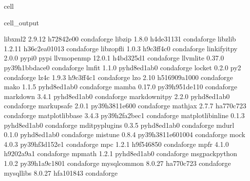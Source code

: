 \documentclass[letterpaper,table,10pt,english]{jupyterBook}
\begin{document}
\begin{sphinxuseclass}{cell}
\begin{sphinxVerbatimOutput}
\begin{sphinxuseclass}{cell_output}
\begin{sphinxVerbatim}[commandchars=\\\{\}]
libxml2                   2.9.12               h72842e0\PYGZus{}0    conda\PYGZhy{}forge
libzip                    1.8.0                h4de3113\PYGZus{}1    conda\PYGZhy{}forge
libzlib                   1.2.11            h36c2ea0\PYGZus{}1013    conda\PYGZhy{}forge
libzopfli                 1.0.3                h9c3ff4c\PYGZus{}0    conda\PYGZhy{}forge
linkify\PYGZhy{}it\PYGZhy{}py             2.0.0                    pypi\PYGZus{}0    pypi
llvm\PYGZhy{}openmp               12.0.1               h4bd325d\PYGZus{}1    conda\PYGZhy{}forge
llvmlite                  0.37.0           py39h1bbdace\PYGZus{}0    conda\PYGZhy{}forge
lmfit                     1.1.0              pyhd8ed1ab\PYGZus{}0    conda\PYGZhy{}forge
locket                    0.2.0                      py\PYGZus{}2    conda\PYGZhy{}forge
lz4\PYGZhy{}c                     1.9.3                h9c3ff4c\PYGZus{}1    conda\PYGZhy{}forge
lzo                       2.10              h516909a\PYGZus{}1000    conda\PYGZhy{}forge
mako                      1.1.5              pyhd8ed1ab\PYGZus{}0    conda\PYGZhy{}forge
mamba                     0.17.0           py39h951de11\PYGZus{}0    conda\PYGZhy{}forge
markdown                  3.4.1              pyhd8ed1ab\PYGZus{}0    conda\PYGZhy{}forge
markdown\PYGZhy{}it\PYGZhy{}py            2.2.0              pyhd8ed1ab\PYGZus{}0    conda\PYGZhy{}forge
markupsafe                2.0.1            py39h3811e60\PYGZus{}0    conda\PYGZhy{}forge
mathjax                   2.7.7                ha770c72\PYGZus{}3    conda\PYGZhy{}forge
matplotlib\PYGZhy{}base           3.4.3            py39h2fa2bec\PYGZus{}1    conda\PYGZhy{}forge
matplotlib\PYGZhy{}inline         0.1.3              pyhd8ed1ab\PYGZus{}0    conda\PYGZhy{}forge
mdit\PYGZhy{}py\PYGZhy{}plugins           0.3.5              pyhd8ed1ab\PYGZus{}0    conda\PYGZhy{}forge
mdurl                     0.1.0              pyhd8ed1ab\PYGZus{}0    conda\PYGZhy{}forge
mistune                   0.8.4           py39h3811e60\PYGZus{}1004    conda\PYGZhy{}forge
mock                      4.0.3            py39hf3d152e\PYGZus{}1    conda\PYGZhy{}forge
mpc                       1.2.1                h9f54685\PYGZus{}0    conda\PYGZhy{}forge
mpfr                      4.1.0                h9202a9a\PYGZus{}1    conda\PYGZhy{}forge
mpmath                    1.2.1              pyhd8ed1ab\PYGZus{}0    conda\PYGZhy{}forge
msgpack\PYGZhy{}python            1.0.2            py39h1a9c180\PYGZus{}1    conda\PYGZhy{}forge
mysql\PYGZhy{}common              8.0.27               ha770c72\PYGZus{}3    conda\PYGZhy{}forge
mysql\PYGZhy{}libs                8.0.27               hfa10184\PYGZus{}3    conda\PYGZhy{}forge

\end{sphinxVerbatim}
\end{sphinxuseclass}
\end{sphinxVerbatimOutput}
\end{sphinxuseclass}
\end{document}

